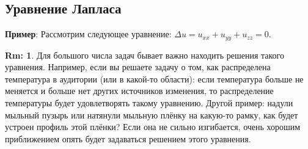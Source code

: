 \documentclass[12pt]{article}
\theoremstyle{definition}
\newtheorem{rem}{Rm:}
\begin{document}
\subsection*{Уравнение Лапласа}
\textbf{Пример}: Рассмотрим следующее уравнение: $\Delta u = u_{xx} + u_{yy} + u_{zz} = 0$. 

\begin{rem}
	Для большого числа задач бывает важно находить решения такого уравнения. Например, если вы решаете задачу о том, как распределена температура в аудитории (или в какой-то области): если температура больше не меняется и больше нет других источников изменения, то распределение температуры будет удовлетворять такому уравнению. Другой пример: надули мыльный пузырь или натянули мыльную плёнку на какую-то рамку, как будет устроен профиль этой плёнки? Если она не сильно изгибается, очень хорошим приближением опять будет задаваться решением этого уравнения.
\end{rem} 
\end{document}
